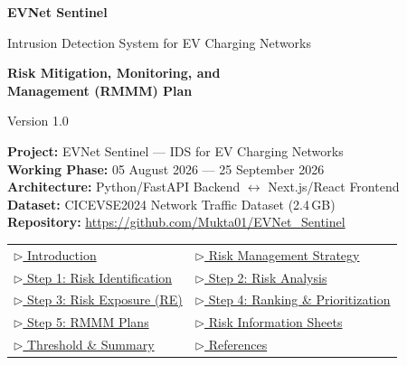 \documentclass[11pt, a4paper]{article}
\begin{document}
\begin{titlepage}
\centering
\vspace*{1.5cm}

{\Huge\bfseries\textcolor{primary}{EVNet Sentinel}\par}
\vspace{0.4cm}
{\Large\textcolor{sectionblue}{Intrusion Detection System for EV Charging Networks}\par}
\vspace{1.5cm}

{\LARGE\bfseries Risk Mitigation, Monitoring, and\\Management (RMMM) Plan\par}
\vspace{0.3cm}
{\large Version 1.0\par}
\vspace{1.5cm}

\begin{tcolorbox}[colback=lightgray, colframe=darkbg, width=0.82\textwidth, rounded corners]
\centering
\textbf{Project:} EVNet Sentinel --- IDS for EV Charging Networks\\[0.3em]
\textbf{Working Phase:} 05 August 2026 --- 25 September 2026\\[0.3em]
\textbf{Architecture:} Python/FastAPI Backend $\longleftrightarrow$ Next.js/React Frontend\\[0.3em]
\textbf{Dataset:} CICEVSE2024 Network Traffic Dataset (2.4\,GB)\\[0.3em]
\textbf{Repository:} \url{https://github.com/Mukta01/EVNet_Sentinel}
\end{tcolorbox}

\vspace{1.2cm}

\begin{tcolorbox}[colback=blue!3, colframe=primary, width=0.82\textwidth, rounded corners, title={\textbf{Quick Navigation (Click to Jump)}}]
\centering
\begin{tabular}{ll}
\hyperref[sec:intro]{\textcolor{primary}{$\triangleright$ Introduction}} & \hyperref[sec:strategy]{\textcolor{primary}{$\triangleright$ Risk Management Strategy}} \\[0.3em]
\hyperref[sec:identification]{\textcolor{primary}{$\triangleright$ Step 1: Risk Identification}} & \hyperref[sec:analysis]{\textcolor{primary}{$\triangleright$ Step 2: Risk Analysis}} \\[0.3em]
\hyperref[sec:exposure]{\textcolor{primary}{$\triangleright$ Step 3: Risk Exposure (RE)}} & \hyperref[sec:ranking]{\textcolor{primary}{$\triangleright$ Step 4: Ranking \& Prioritization}} \\[0.3em]
\hyperref[sec:rmmm]{\textcolor{primary}{$\triangleright$ Step 5: RMMM Plans}} & \hyperref[sec:infosheet]{\textcolor{primary}{$\triangleright$ Risk Information Sheets}} \\[0.3em]
\hyperref[sec:threshold]{\textcolor{primary}{$\triangleright$ Threshold \& Summary}} & \hyperref[sec:references]{\textcolor{primary}{$\triangleright$ References}} \\
\end{tabular}
\end{tcolorbox}


\end{titlepage}
\end{document}
